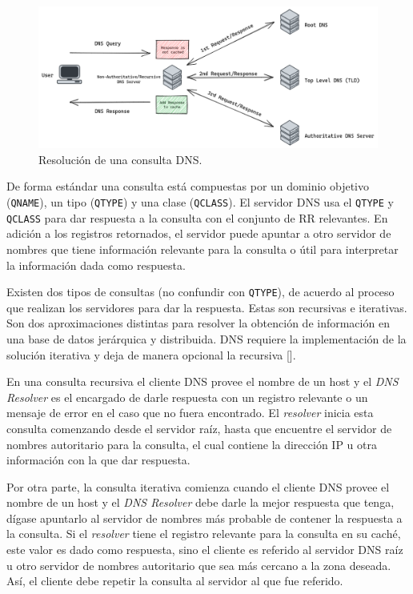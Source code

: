 \begin{figure}[!ht]
    \centering
    \includegraphics[width=\linewidth]{draws/dns-query.png}
    \caption{Resolución de una consulta DNS.}
\end{figure}

De forma estándar una consulta está compuestas por un dominio objetivo (\verb|QNAME|), un tipo (\verb|QTYPE|) y una clase (\verb|QCLASS|). El servidor DNS usa el \verb|QTYPE| y \verb|QCLASS| para dar respuesta a la consulta con el conjunto de RR relevantes. En adición a los registros retornados, el servidor puede apuntar a otro servidor de nombres que tiene información relevante para la consulta o útil para interpretar la información dada como respuesta.

Existen dos tipos de consultas (no confundir con \verb|QTYPE|), de acuerdo al proceso que realizan los servidores para dar la respuesta. Estas son recursivas e iterativas. Son dos aproximaciones distintas para resolver la obtención de información en una base de datos jerárquica y distribuida. DNS requiere la implementación de la solución iterativa y deja de manera opcional la recursiva [\cite{rfc_1034}].

En una consulta recursiva el cliente DNS provee el nombre de un host y el \textit{DNS Resolver} es el encargado de darle respuesta con un registro relevante o un mensaje de error en el caso que no fuera encontrado. El \textit{resolver} inicia esta consulta comenzando desde el servidor raíz, hasta que encuentre el servidor de nombres autoritario para la consulta, el cual contiene la dirección IP u otra información con la que dar respuesta.

Por otra parte, la consulta iterativa comienza cuando el cliente DNS provee el nombre de un host y el \textit{DNS Resolver} debe darle la mejor respuesta que tenga, dígase apuntarlo al servidor de nombres más probable de contener la respuesta a la consulta. Si el \textit{resolver} tiene el registro relevante para la consulta en su caché, este valor es dado como respuesta, sino el cliente es referido al servidor DNS raíz u otro servidor de nombres autoritario que sea más cercano a la zona deseada. Así, el cliente debe repetir la consulta al servidor al que fue referido.

